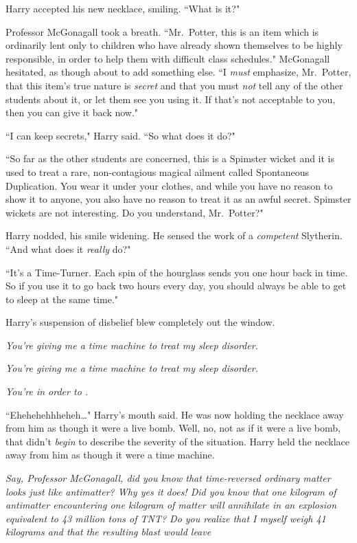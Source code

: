 Harry accepted his new necklace, smiling. ``What is it?"

Professor McGonagall took a breath. ``Mr.~Potter, this is an item which is ordinarily lent only to children who have already shown themselves to be highly responsible, in order to help them with difficult class schedules." McGonagall hesitated, as though about to add something else. ``I \emph{must} emphasize, Mr.~Potter, that this item's true nature is \emph{secret} and that you must \emph{not} tell any of the other students about it, or let them see you using it. If that's not acceptable to you, then you can give it back now."

``I can keep secrets," Harry said. ``So what does it do?"

``So far as the other students are concerned, this is a Spimster wicket and it is used to treat a rare, non-contagious magical ailment called Spontaneous Duplication. You wear it under your clothes, and while you have no reason to show it to anyone, you also have no reason to treat it as an awful secret. Spimster wickets are not interesting. Do you understand, Mr.~Potter?"

Harry nodded, his smile widening. He sensed the work of a \emph{competent} Slytherin. ``And what does it \emph{really} do?"

``It's a Time-Turner. Each spin of the hourglass sends you one hour back in time. So if you use it to go back two hours every day, you should always be able to get to sleep at the same time."

Harry's suspension of disbelief blew completely out the window.

\emph{You're giving me a time machine to treat my sleep disorder.}

\emph{You're giving me a \emph{time machine} to treat my \emph{sleep disorder}.}

\emph{You're  in order to .}

``Ehehehehhheheh{\ldots}" Harry's mouth said. He was now holding the necklace away from him as though it were a live bomb. Well, no, not as if it were a live bomb, that didn't \emph{begin} to describe the severity of the situation. Harry held the necklace away from him as though it were a time machine.

\emph{Say, Professor McGonagall, did you know that time-reversed ordinary matter looks just like antimatter? Why yes it does! Did you know that one kilogram of antimatter encountering one kilogram of matter will annihilate in an explosion equivalent to 43 million tons of TNT? Do you realize that I myself weigh 41 kilograms and that the resulting blast would leave }

